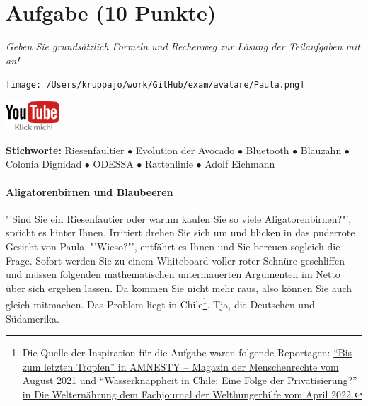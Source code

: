 \documentclass[a4paper, 9pt]{scrartcl}\usepackage[]{graphicx}\usepackage[]{xcolor}
\begin{document}
 
\clearpage

\section{Aufgabe \hfill (10 Punkte)}

\textit{Geben Sie grundsätzlich Formeln und Rechenweg zur Lösung der Teilaufgaben mit an!} \\[1Ex]
 

 
\begin{minipage}[t]{0.5\textwidth}
\texttt{[image: /Users/kruppajo/work/GitHub/exam/avatare/Paula.png]}
\end{minipage}
\begin{minipage}[t]{0.5\textwidth}
\hfill
\href{https://youtu.be/https://youtu.be/k2G52hMIfqk}{\includegraphics[width = 2cm]{img/youtube}}
\end{minipage}

{\tiny\textbf{Stichworte:} Riesenfaultier $\bullet$ Evolution der Avocado $\bullet$ Bluetooth $ \bullet$ Blauzahn $\bullet$ Colonia Dignidad $\bullet$ ODESSA $\bullet$ Rattenlinie $\bullet$ Adolf Eichmann}



\paragraph{Aligatorenbirnen und Blaubeeren}



"'Sind Sie ein Riesenfautier oder warum kaufen Sie so viele Aligatorenbirnen?"', spricht es hinter Ihnen. Irritiert drehen Sie sich um und blicken in das puderrote Gesicht von Paula. "'Wieso?"', entfährt es Ihnen und Sie bereuen sogleich die Frage. Sofort werden Sie zu einem Whiteboard voller roter Schnüre geschliffen und müssen folgenden mathematischen untermauerten Argumenten im Netto über sich ergehen lassen. Da kommen Sie nicht mehr raus, also können Sie auch gleich mitmachen. Das Problem liegt in Chile\footnote{Die Quelle der Inspiration für die Aufgabe waren folgende Reportagen: \href{https://www.amnesty.ch/de/ueber-amnesty/publikationen/magazin-amnesty/2021-3/bis-zum-letzten-tropfen}{"`Bis zum letzten Tropfen"' in AMNESTY – Magazin der Menschenrechte vom August 2021} und \href{https://www.welthungerhilfe.de/welternaehrung/rubriken/klima-ressourcen/wassernot-in-chile-eine-folge-der-privatisierung}{"`Wasserknappheit in Chile: Eine Folge der Privatisierung?"' in Die Welternährung dem Fachjournal der Welthungerhilfe vom April 2022.}}. Tja, die Deutschen und Südamerika.\\
\end{document}
